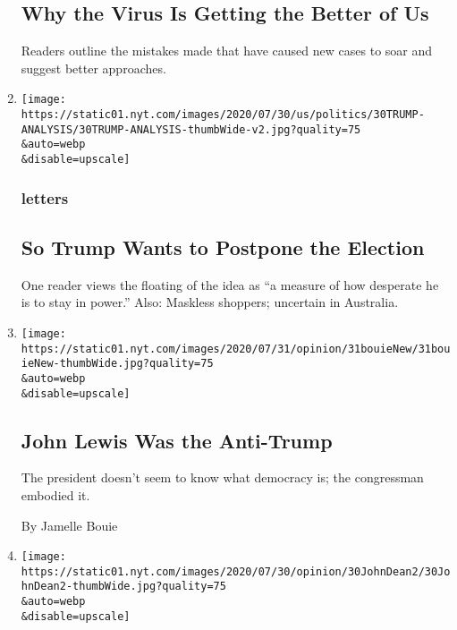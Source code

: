 \begin{enumerate}
  \hypertarget{why-the-virus-is-getting-the-better-of-us}{%
  \subsection{Why the Virus Is Getting the Better of
  Us}\label{why-the-virus-is-getting-the-better-of-us}}

  Readers outline the mistakes made that have caused new cases to soar
  and suggest better approaches.
\item
  \href{/2020/07/31/opinion/letters/trump-election.html}{}

  \texttt{[image: https://static01.nyt.com/images/2020/07/30/us/politics/30TRUMP-ANALYSIS/30TRUMP-ANALYSIS-thumbWide-v2.jpg?quality=75\\\&auto=webp\\\&disable=upscale]}

  \hypertarget{letters-2}{%
  \subsubsection{letters}\label{letters-2}}

  \hypertarget{so-trump-wants-to-postpone-the-election}{%
  \subsection{So Trump Wants to Postpone the
  Election}\label{so-trump-wants-to-postpone-the-election}}

  One reader views the floating of the idea as ``a measure of how
  desperate he is to stay in power.'' Also: Maskless shoppers; uncertain
  in Australia.
\item
  \href{/2020/07/31/opinion/john-lewis-trump-election-2020.html}{}

  \texttt{[image: https://static01.nyt.com/images/2020/07/31/opinion/31bouieNew/31bouieNew-thumbWide.jpg?quality=75\\\&auto=webp\\\&disable=upscale]}

  \hypertarget{john-lewis-was-the-anti-trump}{%
  \subsection{John Lewis Was the
  Anti-Trump}\label{john-lewis-was-the-anti-trump}}

  The president doesn't seem to know what democracy is; the congressman
  embodied it.

  By Jamelle Bouie
\item
  \href{/2020/07/31/opinion/trump-nixon-authoritarianism.html}{}

  \texttt{[image: https://static01.nyt.com/images/2020/07/30/opinion/30JohnDean2/30JohnDean2-thumbWide.jpg?quality=75\\\&auto=webp\\\&disable=upscale]}


\end{enumerate}
